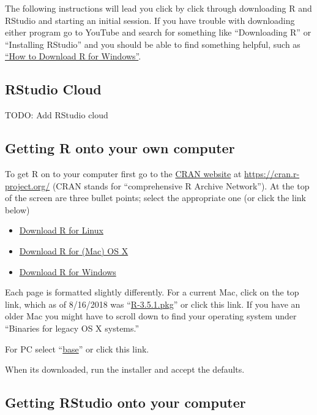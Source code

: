 \documentclass[
]{book}
\providecommand{\tightlist}{%
  \setlength{\itemsep}{0pt}\setlength{\parskip}{0pt}}
\begin{document}
The following instructions will lead you click by click through downloading R and RStudio and starting an initial session. If you have trouble with downloading either program go to YouTube and search for something like ``Downloading R'' or ``Installing RStudio'' and you should be able to find something helpful, such as \href{https://www.youtube.com/watch?v=GYdmkLgV9n8}{``How to Download R for Windows''}.

\hypertarget{rstudio-cloud}{%
\subsection{RStudio Cloud}\label{rstudio-cloud}}

TODO: Add RStudio cloud

\hypertarget{getting-r-onto-your-own-computer}{%
\subsection{Getting R onto your own computer}\label{getting-r-onto-your-own-computer}}

To get R on to your computer first go to the \href{https://cran.r-project.org/}{CRAN website} at \url{https://cran.r-project.org/} (CRAN stands for ``comprehensive R Archive Network''). At the top of the screen are three bullet points; select the appropriate one (or click the link below)

\begin{itemize}
\tightlist
\item
  \href{https://cran.r-project.org/bin/linux/}{Download R for Linux}
\item
  \href{https://cran.r-project.org/bin/macosx/}{Download R for (Mac) OS X}
\item
  \href{https://cran.r-project.org/bin/windows/}{Download R for Windows}
\end{itemize}

Each page is formatted slightly differently. For a current Mac, click on the top link, which as of 8/16/2018 was ``\href{https://cran.r-project.org/bin/macosx/R-3.5.1.pkg}{R-3.5.1.pkg}'' or click this link. If you have an older Mac you might have to scroll down to find your operating system under ``Binaries for legacy OS X systems.''

For PC select ``\href{https://cran.r-project.org/bin/windows/base/}{base}'' or click this link.

When its downloaded, run the installer and accept the defaults.

\hypertarget{getting-rstudio-onto-your-computer}{%
\subsection{Getting RStudio onto your computer}\label{getting-rstudio-onto-your-computer}}
\end{document}

